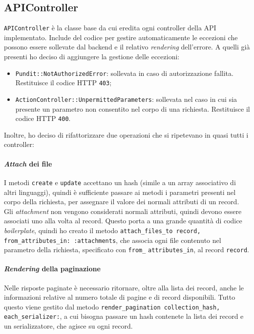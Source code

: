 \subsection{APIController}
\verb|APIController| è la classe base da cui eredita ogni controller della API implementato. Include del codice per gestire automaticamente le eccezioni che possono essere sollevate dal backend e il relativo \emph{rendering} dell'errore. A quelli già presenti ho deciso di aggiungere la gestione delle eccezioni:
\begin{itemize}
	\item \verb|Pundit::NotAuthorizedError|: sollevata in caso di autorizzazione fallita. Restituisce il codice HTTP \verb|403|;
	\item \verb|ActionController::UnpermittedParameters|: sollevata nel caso in cui sia presente un parametro non consentito nel corpo di una richiesta. Restituisce il codice HTTP \verb|400|.
\end{itemize}
Inoltre, ho deciso di rifattorizzare due operazioni che si ripetevano in quasi tutti i controller:

\paragraph{\emph{Attach} dei file} I metodi \verb|create| e \verb|update| accettano un hash (simile a un array associativo di altri linguaggi), quindi è sufficiente passare ai metodi i parametri presenti nel corpo della richiesta, per assegnare il valore dei normali attributi di un record. Gli \emph{attachment} non vengono considerati normali attributi, quindi devono essere associati uno alla volta al record. Questo porta a una grande quantità di codice \emph{boilerplate}, quindi ho creato il metodo \texttt{attach_files_to record, from_attributes_in: :attachments}, che associa ogni file contenuto nel parametro della richiesta, specificato con \verb|from_| \verb|attributes_in|, al record \verb|record|.

\paragraph{\emph{Rendering} della paginazione} Nelle risposte paginate è necessario ritornare, oltre alla lista dei record, anche le informazioni relative al numero totale di pagine e di record disponibili. Tutto questo viene gestito dal metodo \texttt{render_pagination collection_hash,} \texttt{each_serializer:}, a cui bisogna passare un hash contenete la lista dei record e un serializzatore, che agisce su ogni record.


